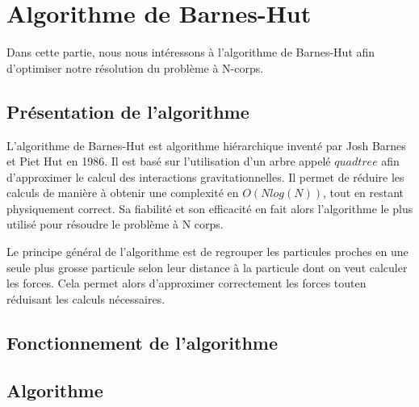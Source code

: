 \chapter{Algorithme de Barnes-Hut}

Dans cette partie, nous nous intéressons à l'algorithme de Barnes-Hut afin d'optimiser notre résolution du problème à N-corps.

\section{Présentation de l'algorithme}

L'algorithme de Barnes-Hut est algorithme hiérarchique inventé par Josh Barnes et Piet Hut en 1986. Il est basé sur l'utilisation d'un arbre appelé $quadtree$ afin d'approximer le calcul des  interactions gravitationnelles. Il permet de réduire les calculs de manière à obtenir une complexité en $O(Nlog(N))$, tout en restant physiquement correct. Sa fiabilité et son efficacité en fait alors l'algorithme le plus utilisé pour résoudre le problème à N corps.
 

Le principe général de l'algorithme est de regrouper les particules proches en une seule plus grosse particule selon leur distance  à la particule dont on veut calculer les forces. Cela permet alors d'approximer correctement les forces touten réduisant les calculs nécessaires.


\section{Fonctionnement de l'algorithme}
 
\section{Algorithme}

